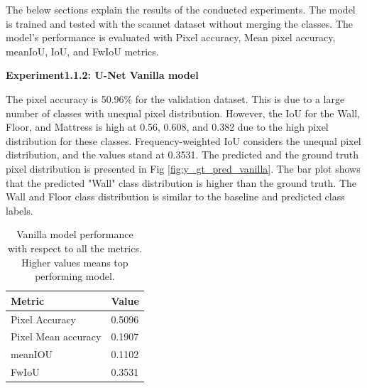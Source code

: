     The below sections explain the results of the conducted experiments. The model is trained and tested with the scannet dataset without merging the classes. The model's performance is evaluated with Pixel accuracy, Mean pixel accuracy, meanIoU, IoU, and FwIoU metrics.

	{ \bf Experiment1.1.2: U-Net Vanilla model}
	
	The pixel accuracy is 50.96\% for the validation dataset. This is due to a large number of classes with unequal pixel distribution. However, the IoU for the Wall, Floor, and Mattress is high at 0.56, 0.608, and 0.382 due to the high pixel distribution for these classes. Frequency-weighted IoU considers the unequal pixel distribution, and the values stand at 0.3531. The predicted and the ground truth pixel distribution is presented in Fig \ref{fig:y_gt_pred_vanilla}. The bar plot shows that the predicted "Wall" class distribution is higher than the ground truth. The Wall and Floor class distribution is similar to the baseline and predicted class labels. 
    
   	
   	\begin{table}
    \begin{center}
    	\begin{tabular}{ | l | p{12cm} |}
    		\hline
    		
    		\cellcolor{purple!30}Metric & \cellcolor{purple!30}Value \\ \hline
    		Pixel Accuracy & 0.5096 \\ \hline
    		Pixel Mean accuracy & 0.1907  \\ \hline
    		meanIOU & 0.1102 \\ \hline
    		FwIoU & 0.3531 \\ \hline
    		\hline
    	\end{tabular}
   		\caption{Vanilla model performance with respect to all the metrics. Higher values means top performing model.}
	    \label{tab:caption}
    \end{center}
	\end{table}
	
